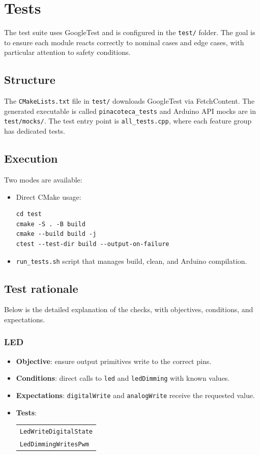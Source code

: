\chapter{Tests}

The test suite uses GoogleTest and is configured in the \texttt{test/} folder. The goal is to ensure each module reacts correctly to nominal cases and edge cases, with particular attention to safety conditions.

\section{Structure}
The \texttt{CMakeLists.txt} file in \texttt{test/} downloads GoogleTest via FetchContent.
The generated executable is called \texttt{pinacoteca\_tests} and Arduino API mocks are in \texttt{test/mocks/}.
The test entry point is \texttt{all\_tests.cpp}, where each feature group has dedicated tests.

\section{Execution}
Two modes are available:
\begin{itemize}
  \item Direct CMake usage:
  \begin{lstlisting}[style=cppstyle]
cd test
cmake -S . -B build
cmake --build build -j
ctest --test-dir build --output-on-failure
  \end{lstlisting}
  \item \texttt{run\_tests.sh} script that manages build, clean, and Arduino compilation.
\end{itemize}

\section{Test rationale}
Below is the detailed explanation of the checks, with objectives, conditions, and expectations.

\subsection{LED}
\begin{itemize}
  \item \textbf{Objective}: ensure output primitives write to the correct pins.
  \item \textbf{Conditions}: direct calls to \texttt{led} and \texttt{ledDimming} with known values.
  \item \textbf{Expectations}: \texttt{digitalWrite} and \texttt{analogWrite} receive the requested value.
  \item \textbf{Tests}:
  \begin{tabular}[t]{@{}l@{}}
    \texttt{LedWriteDigitalState}\\
    \texttt{LedDimmingWritesPwm}
  \end{tabular}
\end{itemize}

